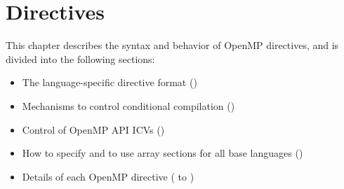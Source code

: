 %
%
%
%
%
%
%
%
%
%

\chapter{Directives}
\label{chap:Directives}
This chapter describes the syntax and behavior of OpenMP directives, and is divided 
into the following sections:

\begin{itemize}
\item The language-specific directive format 
()

\item Mechanisms to control conditional compilation 
()

\item Control of OpenMP API ICVs 
()

\item How to specify and to use array sections for all base languages 
() 

\item Details of each OpenMP directive 
( to 
)
\end{itemize}

